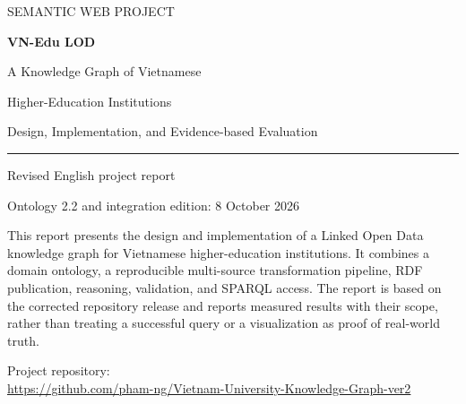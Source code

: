 \documentclass[11pt,a4paper]{article}
\begin{document}
\hypersetup{pageanchor=false}
\begin{titlepage}
\centering
\vspace*{18mm}
{\sffamily\large SEMANTIC WEB PROJECT\par}
\vspace{18mm}
{\sffamily\bfseries\Huge VN-Edu LOD\par}
\vspace{8mm}
{\LARGE A Knowledge Graph of Vietnamese\par Higher-Education Institutions\par}
\vspace{10mm}
{\Large Design, Implementation, and Evidence-based Evaluation\par}
\vspace{10mm}
{\color{accent}\rule{0.65\textwidth}{1pt}\par}
\vspace{10mm}
{\large Revised English project report\par}
{\large Ontology 2.2 and integration edition: 8 October 2026\par}
\vfill
\begin{minipage}{0.9\textwidth}\small
This report presents the design and implementation of a Linked Open Data knowledge graph
for Vietnamese higher-education institutions. It combines a domain ontology, a reproducible
multi-source transformation pipeline, RDF publication, reasoning, validation, and SPARQL
access. The report is based on the corrected repository release and reports measured results
with their scope, rather than treating a successful query or a visualization as proof of
real-world truth.

Project repository:\\
\url{https://github.com/pham-ng/Vietnam-University-Knowledge-Graph-ver2}
\end{minipage}
\end{titlepage}
\hypersetup{pageanchor=true}
\end{document}
